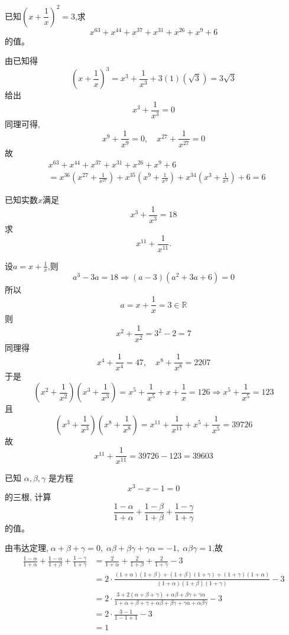 \begin{questions}
    \question 已知$\left(x + \dfrac{1}{x}\right)^2=3$,求
    \[
    x^{63} + x^{44} + x^{37} + x^{31} + x^{26} + x^9 + 6
    \]
    的值。
    \begin{solution}
        由已知得
        \[
        \left(x + \frac{1}{x}\right)^3 = x^3 + \frac{1}{x^3} + 3(1)(\sqrt{3}) = 3\sqrt{3}
        \]
        给出
        \[
        x^3 + \frac{1}{x^3} = 0
        \]
        同理可得,
        \[
        x^9 + \frac{1}{x^9} = 0, \quad x^{27} + \frac{1}{x^{27}} = 0
        \]
        故
        \begin{align*}
        &x^{63} + x^{44} + x^{37} + x^{31} + x^{26} + x^9 + 6 \\
        & =x^{36}\left(x^{27} + \frac{1}{x^{27}}\right) + x^{35} \left(x^9 + \frac{1}{x^9}\right) + x^{34} \left(x^3 + \frac{1}{x^3}\right) + 6 =6
        \end{align*}
    \end{solution}

    \question 已知实数$x$满足
    \[
    x^3 + \frac{1}{x^3} = 18
    \]
    求
    \[
    x^{11} + \frac{1}{x^{11}}.
    \]
    \begin{solution}
        设$a = x + \frac{1}{x}$,则
        \[
        a^3 - 3a = 18 \Rightarrow (a-3)(a^2 + 3a + 6) = 0
        \]
        所以
        \[
        a = x + \frac{1}{x} = 3 \in \mathbb{R}
        \]
        则
        \[
        x^2+\frac{1}{x^2} = 3^2-2=7
        \]
        同理得
        \[
        x^4+\frac{1}{x^4} = 47,\quad x^8+\frac{1}{x^8} = 2207
        \]
        于是
        \[
        \left(x^2+\frac{1}{x^2}\right)\left(x^3 + \frac{1}{x^3}\right)=x^5+\frac{1}{x^5} + x + \frac{1}{x}= 126 \Rightarrow x^5+\frac{1}{x^5}=123
        \]
        且
        \[
        \left(x^3+\frac{1}{x^3}\right)\left(x^8 + \frac{1}{x^8}\right)=x^{11}+\frac{1}{x^{11}} + x^5 + \frac{1}{x^5}= 39726
        \]
        故
        \[
        x^{11}+\frac{1}{x^{11}}=39726-123=39603
        \]
    \end{solution}

    \question 已知 $\alpha, \beta, \gamma$ 是方程
    \[
    x^3 - x - 1 = 0
    \]
    的三根, 计算
    \[
    \frac{1-\alpha}{1+\alpha} + \frac{1-\beta}{1+\beta} + \frac{1-\gamma}{1+\gamma}
    \]
    的值。 
    \begin{solution}
        由韦达定理,$\;\alpha+\beta+\gamma=0,\;\alpha\beta+\beta\gamma+\gamma\alpha=-1,\;\alpha\beta\gamma=1$,故
        \begin{align*}
        \frac{1-\alpha}{1+\alpha} + \frac{1-\alpha}{1+\beta} + \frac{1-\gamma}{1+\gamma} 
        &= \frac{2}{1+\alpha} + \frac{2}{1+\beta} + \frac{2}{1+\gamma}-3 \\
        &= 2\cdot\frac{(1+\alpha)(1+\beta)+(1+\beta)(1+\gamma)+(1+\gamma)(1+\alpha)}{(1+\alpha)(1+\beta)(1+\gamma)}-3 \\
        &= 2\cdot\frac{3+2(\alpha+\beta+\gamma)+\alpha\beta+\beta\gamma+\gamma\alpha}{1+\alpha+\beta+\gamma+\alpha\beta+\beta\gamma+\gamma\alpha+\alpha\beta\gamma}-3 \\
        &= 2\cdot\frac{3-1}{1-1+1}-3 \\
        &= 1
        \end{align*}
    \end{solution}


\end{questions}
